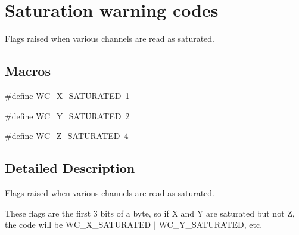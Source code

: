\hypertarget{group___saturation_warning_codes}{\section{Saturation warning codes}
\label{group___saturation_warning_codes}
}


Flags raised when various channels are read as saturated.  


\subsection*{Macros}
\begin{DoxyCompactItemize}
\item 
\#define \hyperlink{group___saturation_warning_codes_ga74e435d4abf3a4e6687f614980e62de3}{W\+C\+\_\+\+X\+\_\+\+S\+A\+T\+U\+R\+A\+T\+E\+D}~1
\item 
\#define \hyperlink{group___saturation_warning_codes_ga30ebd8715fb9bae137aa0d08c6e397af}{W\+C\+\_\+\+Y\+\_\+\+S\+A\+T\+U\+R\+A\+T\+E\+D}~2
\item 
\#define \hyperlink{group___saturation_warning_codes_gaf2fae70fdd5d89214f38c4cf23292d8a}{W\+C\+\_\+\+Z\+\_\+\+S\+A\+T\+U\+R\+A\+T\+E\+D}~4
\end{DoxyCompactItemize}


\subsection{Detailed Description}
Flags raised when various channels are read as saturated. 

These flags are the first 3 bits of a byte, so if X and Y are saturated but not Z, the code will be {\ttfamily W\+C\+\_\+\+X\+\_\+\+S\+A\+T\+U\+R\+A\+T\+E\+D $\vert$ W\+C\+\_\+\+Y\+\_\+\+S\+A\+T\+U\+R\+A\+T\+E\+D}, etc. 

